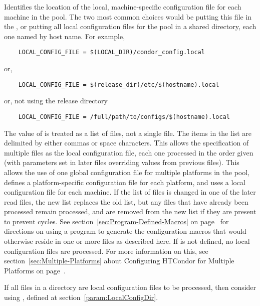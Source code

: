 \begin{description}
\label{param:LocalConfigFile}
\item[\Macro{LOCAL\_CONFIG\_FILE}]
  Identifies the
  location of the local, machine-specific configuration
  file for each machine
  in the pool.  The two most common choices would be putting this
  file in the , or putting all
  local configuration files for the pool in a shared directory, each one
  named by host name.  For example,
  \begin{verbatim}
    LOCAL_CONFIG_FILE = $(LOCAL_DIR)/condor_config.local
  \end{verbatim}
  or,
  \begin{verbatim}
    LOCAL_CONFIG_FILE = $(release_dir)/etc/$(hostname).local
  \end{verbatim}
  or, not using the release directory
  \begin{verbatim}
    LOCAL_CONFIG_FILE = /full/path/to/configs/$(hostname).local
  \end{verbatim}
  
  The value of  is treated as a list of files,
  not a
  single file.  The items in the list are delimited by either commas
  or space characters.
  This allows the specification of multiple files as
  the local configuration file, each one processed in the
  order given (with parameters set in later files overriding values
  from previous files).  This allows the use of one global
  configuration file for multiple platforms in the pool, defines a
  platform-specific configuration file for each platform, and uses a
  local configuration file for each machine. 
  If the list of files is changed in one of the later read files, the new list
  replaces the old list, but any files that have already been processed
  remain processed, and are removed from the new list if they are present
  to prevent cycles.
  See section~\ref{sec:Program-Defined-Macros} on 
  page~\pageref{sec:Program-Defined-Macros} for directions on
  using a program to generate the configuration macros that would
  otherwise reside in one or more files as described here.
  If  is not defined, no local configuration
  files are processed.  For more information on this, see
  section~\ref{sec:Multiple-Platforms} about Configuring HTCondor for
  Multiple Platforms on page~\pageref{sec:Multiple-Platforms}.

  If all files in a directory are local configuration files to be processed,
  then consider using , defined at
  section~\ref{param:LocalConfigDir}.


\end{description}
